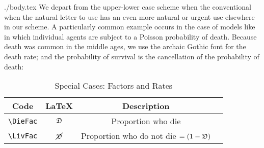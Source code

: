 \documentclass{econtex}
\begin{document}
\begin{verbatimwrite}{./body.tex}
We depart from the upper-lower case scheme when the conventional
when the natural letter to use has an even more natural or urgent use elsewhere in our scheme.
A particularly common example occurs in the case of models like \cite{blanchardFinite} in which 
individual agents are subject to a Poisson probability of death.  Because death was common in the 
middle ages, we use the archaic Gothic font for the death rate; and the probability of survival is the cancellation of the probability of death:
\begin{table}[h]
	\centering
	\begin{tabular}{|>{\ttfamily}cccl|} 		
		\hline
		 Code & LaTeX & Description &  \\ 
		\hline
   \verb|\DieFac|     & $\mathfrak{D}$     & Proportion who die  & 
\\ \verb|\LivFac|     & $\cancel{\mathfrak{D}}$     & Proportion who do not die $=(1-\mathfrak{D})$ & 
\\	\hline
	\end{tabular}
	\caption{Special Cases: Factors and Rates}
	\label{table:SpecialFactors}
\end{table}	


\end{verbatimwrite}

\end{document}
